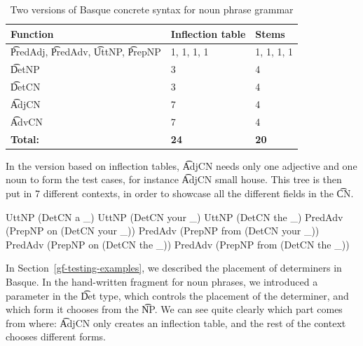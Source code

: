 \begin{table}[h]

\centering
\begin{tabular}{| p{2.3cm} | l | l |}
\hline
{\bf Function} & {\bf Inflection table}
   & {\bf Stems} \\ \hline
 
\t{PredAdj}, \t{PredAdv}, \t{UttNP}, \t{PrepNP}  & 1, 1, 1, 1 & 1, 1,
                                                                1, 1
  \\ \hline
\t{DetNP}    & 3 & 4   \\ \hline
\t{DetCN}    & 3 & 4   \\ \hline
\t{AdjCN}    & 7 & 4   \\ \hline
\t{AdvCN}    & 7 & 4   \\ \hline
{\bf Total:} & {\bf 24} & {\bf 20} \\ 
\hline
\end{tabular}
\caption{Two versions of Basque concrete syntax for noun phrase grammar}
\label{basque_versions}
\end{table}

In the version based on inflection tables, \t{AdjCN} needs only one
adjective and one noun to form the test cases, for instance \t{AdjCN
  small house}.
This tree is then put in 7 different contexts, in order to showcase
all the different fields in the \t{CN}.

\begin{EmptyItem}
\begin{Highlighting}[]
UttNP (DetCN a _)
UttNP (DetCN your _)
UttNP (DetCN the _)
PredAdv  (PrepNP on (DetCN your _))
PredAdv  (PrepNP from (DetCN your _))
PredAdv  (PrepNP on (DetCN the _))
PredAdv  (PrepNP from (DetCN the _))
\end{Highlighting}
\end{EmptyItem}

\noindent In Section~\ref{gf-testing-examples}, we described the
placement of determiners in Basque. In the hand-written fragment for
noun phrases, we introduced a parameter in the \t{Det} type, which
controls the placement of the determiner, and which form it chooses
from the \t{NP}. We can see quite clearly which part comes from where:
\t{AdjCN} only creates an inflection table, and the rest of the
context chooses different forms.


